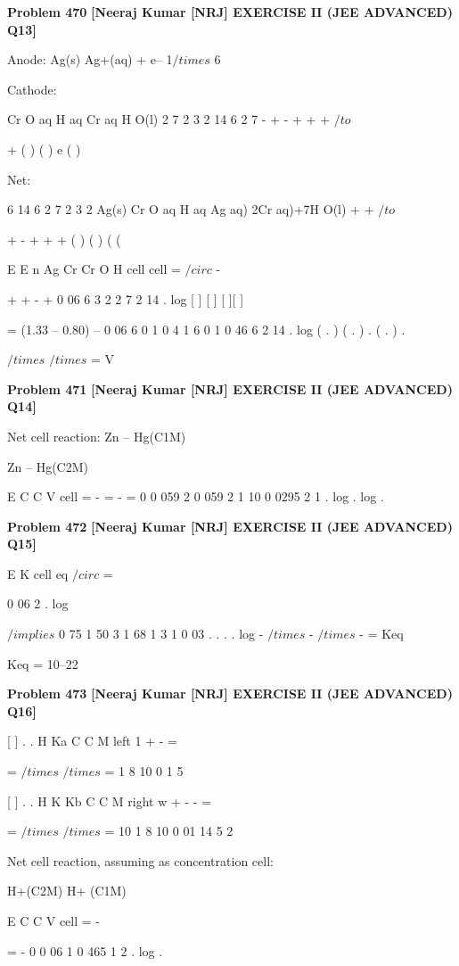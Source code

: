 \begin{problembox}
\textbf{Problem 470} \hfill \textbf{[Neeraj Kumar [NRJ] EXERCISE II (JEE ADVANCED) Q13]}
\label{q:ext-nrj_all_questions-470}

Anode: Ag(s) 
 Ag+(aq) + e-- 1$/times$ 6
 
 Cathode: 
 
 
Cr O
aq
H
aq
Cr
aq
H O(l)
2
7
2
3
2
14
6
2
7
-
+
-
+
+
+
 $/to$
 
+
(
)
(
)
e
(
)
 
 Net: 
 
 
6
14
6
2
7
2
3
2
Ag(s)
Cr O
aq
H
aq
Ag
aq)
2Cr
aq)+7H O(l)
+
+
 $/to$
 
+
-
+
+
+
(
)
(
)
(
(
 
 
E
E
n
Ag
Cr
Cr O
H
cell
cell
=
$/circ$
-
 
+
+
-
+
0 06
6
3
2
2
7
2
14
.
log [
] [
]
[
][
]
 
 = (1.33 -- 0.80) -- 0 06
6
0 1
0 4
1 6
0 1
0 46
6
2
14
.
log ( . )
( . )
.
( . )
.
 
$/times$
$/times$
=
V
\end{problembox}

\begin{problembox}
\textbf{Problem 471} \hfill \textbf{[Neeraj Kumar [NRJ] EXERCISE II (JEE ADVANCED) Q14]}
\label{q:ext-nrj_all_questions-471}

Net cell reaction: Zn -- Hg(C1M) 
 
 
  
Zn -- Hg(C2M)
 
E
C
C
V
cell =
-
= -
=
0
0 059
2
0 059
2
1
10
0 0295
2
1
.
log
.
log
.
\end{problembox}

\begin{problembox}
\textbf{Problem 472} \hfill \textbf{[Neeraj Kumar [NRJ] EXERCISE II (JEE ADVANCED) Q15]}
\label{q:ext-nrj_all_questions-472}

E
K
cell
eq
$/circ$
=
 
0 06
2
.
log
 
 
 $/implies$ 0 75
1 50
3 1 68 1
3 1
0 03
.
.
.
.
log
-
$/times$
-
$/times$
-
=
Keq
 
   Keq = 10--22
\end{problembox}

\begin{problembox}
\textbf{Problem 473} \hfill \textbf{[Neeraj Kumar [NRJ] EXERCISE II (JEE ADVANCED) Q16]}
\label{q:ext-nrj_all_questions-473}

[
]
.
.
H
Ka C
C M
left
1
+
-
=
 
=
$/times$
$/times$
=
1 8 10
0 1
5
 
 
[
]
.
.
H
K
Kb C
C M
right
w
+
-
-
=
 
=
$/times$
$/times$
=
10
1 8 10
0 01
14
5
2
 
 Net cell reaction, assuming as concentration cell:
 
 H+(C2M) 
 H+ (C1M)
 
 
E
C
C
V
cell =
-
 
= -
0
0 06
1
0 465
1
2
.
log
.
\end{problembox}

